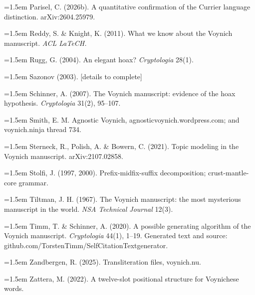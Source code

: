 \documentclass[11pt,a4paper]{article}
\begin{document}
\noindent\hangindent=1.5em Parisel, C. (2026b). A quantitative confirmation of the Currier language distinction. arXiv:2604.25979.\par
\noindent\hangindent=1.5em Reddy, S. \& Knight, K. (2011). What we know about the Voynich manuscript. \emph{ACL LaTeCH.}\par
\noindent\hangindent=1.5em Rugg, G. (2004). An elegant hoax? \emph{Cryptologia} 28(1).\par
\noindent\hangindent=1.5em Sazonov (2003). [details to complete]\par
\noindent\hangindent=1.5em Schinner, A. (2007). The Voynich manuscript: evidence of the hoax hypothesis. \emph{Cryptologia} 31(2), 95--107.\par
\noindent\hangindent=1.5em Smith, E. M. Agnostic Voynich, agnosticvoynich.wordpress.com; and voynich.ninja thread 734.\par
\noindent\hangindent=1.5em Sterneck, R., Polish, A. \& Bowern, C. (2021). Topic modeling in the Voynich manuscript. arXiv:2107.02858.\par
\noindent\hangindent=1.5em Stolfi, J. (1997, 2000). Prefix-midfix-suffix decomposition; crust-mantle-core grammar.\par
\noindent\hangindent=1.5em Tiltman, J. H. (1967). The Voynich manuscript: the most mysterious manuscript in the world. \emph{NSA Technical Journal} 12(3).\par
\noindent\hangindent=1.5em Timm, T. \& Schinner, A. (2020). A possible generating algorithm of the Voynich manuscript. \emph{Cryptologia} 44(1), 1--19. Generated text and source: github.com/TorstenTimm/SelfCitationTextgenerator.\par
\noindent\hangindent=1.5em Zandbergen, R. (2025). Transliteration files, voynich.nu.\par
\noindent\hangindent=1.5em Zattera, M. (2022). A twelve-slot positional structure for Voynichese words.\par
\end{document}
